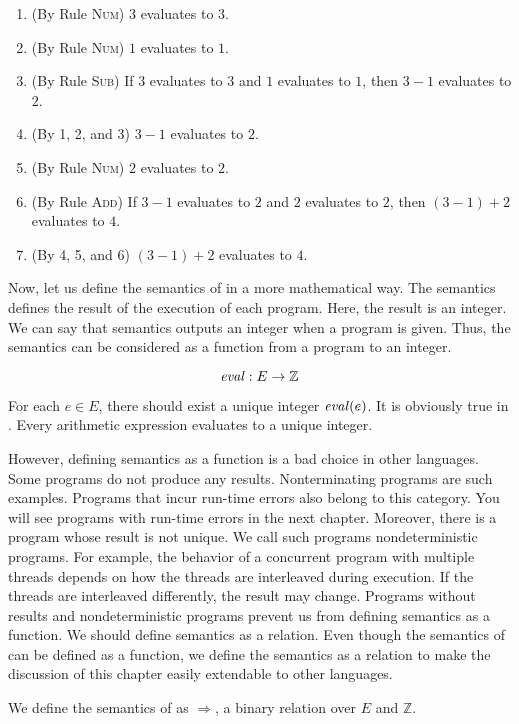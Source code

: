 \begin{enumerate}
  \item (By Rule \textsc{Num}) $3$ evaluates to $3$.
  \item (By Rule \textsc{Num}) $1$ evaluates to $1$.
  \item (By Rule \textsc{Sub}) If $3$ evaluates to $3$ and $1$ evaluates to $1$, then $3-1$
    evaluates to $2$.
  \item (By 1, 2, and 3) $3-1$ evaluates to $2$.
  \item (By Rule \textsc{Num}) $2$ evaluates to $2$.
  \item (By Rule \textsc{Add}) If $3-1$ evaluates to $2$ and $2$ evaluates to $2$, then
    $(3-1)+2$ evaluates to $4$.
  \item (By 4, 5, and 6) $(3-1)+2$ evaluates to $4$.
\end{enumerate}

Now, let us define the semantics of \lang in a more mathematical way. The
semantics defines the result of the execution of each program. Here, the result
is an integer. We can say that semantics outputs an integer when a program is
given. Thus, the semantics can be considered as a function from a program to an
integer.

\[\mbox{\emph{eval}}:E\rightarrow \mathbb{Z}\]

For each $e\in E$, there should exist a unique integer $\mbox{\emph{eval}}(e)$. It
is obviously true in \lang. Every arithmetic expression evaluates to a unique
integer.

However, defining semantics as a function is a bad choice in other languages.
Some programs do not produce any results. Nonterminating programs are such
examples. Programs that incur run-time errors also belong to this category. You
will see programs with run-time errors in the next chapter. Moreover, there is a
program whose result is not unique. We call such programs nondeterministic
programs. For example, the behavior of a concurrent program with multiple
threads depends on how the threads are interleaved during execution. If the
threads are interleaved differently, the result may change. Programs without
results and nondeterministic programs prevent us from defining semantics as a
function. We should define semantics as a relation. Even though the semantics of
\lang can be defined as a function, we define the semantics as a relation to
make the discussion of this chapter easily extendable to other languages.

We define the semantics of \lang as $\Rightarrow$, a binary relation over $E$
and $\mathbb{Z}$.

